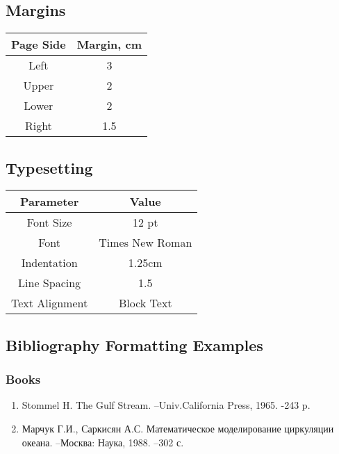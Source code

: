 \documentclass[a4paper, 12pt]{article}
\begin{document}
\subsection*{Margins}

\begin{center}
    \begin{tabular}{| c | c |}
        \hline
        Page Side & Margin, cm \\
        \hline
        Left & 3 \\
        \hline
        Upper & 2 \\
        \hline
        Lower & 2 \\
        \hline
        Right & 1.5 \\
        \hline
    \end{tabular}
\end{center}

\subsection*{Typesetting}

\begin{center}
    \begin{tabular}{| c | c |}
        \hline
        Parameter & Value \\
        \hline
        Font Size & 12 pt  \\
        \hline
        Font & Times New Roman \\
        \hline
        Indentation & 1.25cm \\
        \hline
        Line Spacing & 1.5 \\
        \hline
        Text Alignment & Block Text \\
        \hline
    \end{tabular}
\end{center}

\subsection*{Bibliography Formatting Examples}

\subsubsection*{Books}

\begin{enumerate}
    \item Stommel H. The Gulf Stream. –Univ.California Press, 1965. -243 p.
    \item Марчук Г.И., Саркисян А.С. Математическое моделирование циркуляции 
        океана. –Москва: Наука, 1988. –302 с.
\end{enumerate}
\end{document}
